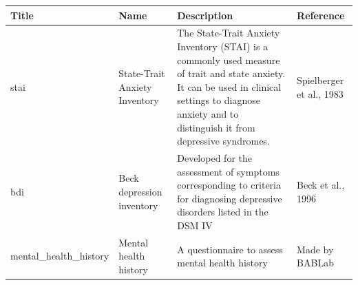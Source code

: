 \documentclass[]{book}
\begin{document}
\begin{longtable}[]{@{}llll@{}}
\toprule
\begin{minipage}[b]{0.22\columnwidth}\raggedright
Title\strut
\end{minipage} & \begin{minipage}[b]{0.27\columnwidth}\raggedright
Name\strut
\end{minipage} & \begin{minipage}[b]{0.22\columnwidth}\raggedright
Description\strut
\end{minipage} & \begin{minipage}[b]{0.18\columnwidth}\raggedright
Reference\strut
\end{minipage}\tabularnewline
\midrule
\endhead
\begin{minipage}[t]{0.22\columnwidth}\raggedright
stai\strut
\end{minipage} & \begin{minipage}[t]{0.27\columnwidth}\raggedright
State-Trait Anxiety Inventory\strut
\end{minipage} & \begin{minipage}[t]{0.22\columnwidth}\raggedright
The State-Trait Anxiety Inventory (STAI) is a commonly used measure of trait and state anxiety. It can be used in clinical settings to diagnose anxiety and to distinguish it from depressive syndromes.\strut
\end{minipage} & \begin{minipage}[t]{0.18\columnwidth}\raggedright
Spielberger et al., 1983\strut
\end{minipage}\tabularnewline
\begin{minipage}[t]{0.22\columnwidth}\raggedright
bdi\strut
\end{minipage} & \begin{minipage}[t]{0.27\columnwidth}\raggedright
Beck depression inventory\strut
\end{minipage} & \begin{minipage}[t]{0.22\columnwidth}\raggedright
Developed for the assessment of symptoms corresponding to criteria for diagnosing depressive disorders listed in the DSM IV\strut
\end{minipage} & \begin{minipage}[t]{0.18\columnwidth}\raggedright
Beck et al., 1996\strut
\end{minipage}\tabularnewline
\begin{minipage}[t]{0.22\columnwidth}\raggedright
mental\_health\_history\strut
\end{minipage} & \begin{minipage}[t]{0.27\columnwidth}\raggedright
Mental health history\strut
\end{minipage} & \begin{minipage}[t]{0.22\columnwidth}\raggedright
A questionnaire to assess mental health history\strut
\end{minipage} & \begin{minipage}[t]{0.18\columnwidth}\raggedright
Made by BABLab\strut
\end{minipage}\tabularnewline
\bottomrule
\end{longtable}
\end{document}
